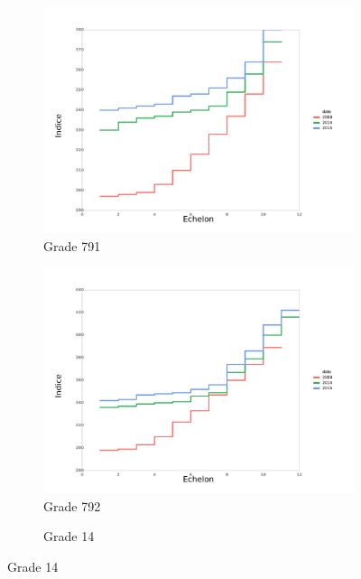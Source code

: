 \documentclass[11pt,a4paper]{article}
\begin{document}
\begin{figure}[ht] 
  \caption{Evolution des grilles: grade par grade}
  \label{echelon_by_negAA} 
  \begin{subfigure}[b]{0.55\linewidth}
      \caption{Grade 791} 
    \label{echelon_by_neg_0} 
    \centering
    \includegraphics[width=1\linewidth]{AA_791_grille_by_neg.pdf} 
  \end{subfigure}%
  \begin{subfigure}[b]{0.55\linewidth}
        \caption{Grade 792} 
    \label{echelon_by_neg_1} 
    \centering
    \includegraphics[width=1\linewidth]{AA_792_grille_by_neg.pdf} 
  \end{subfigure} 
  \begin{subfigure}[b]{0.55\linewidth}
        \caption{Grade 14} 

\end{subfigure}
\end{figure}
\end{document}
